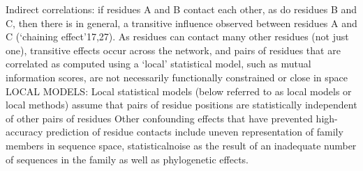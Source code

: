Indirect correlations: \cite{marks2012protein}
	if residues A and B contact each other, as do residues B and C, then there is in general, a transitive influence observed between residues A and C (`chaining effect'17,27). \cite{marks2012protein}
	As residues can contact many other residues (not just one), transitive effects occur across the network, and pairs of residues that are correlated as computed using a `local' statistical model, such as mutual information scores, are not necessarily functionally constrained or close in space \cite{marks2012protein}
LOCAL MODELS: \cite{marks2012protein}
	Local statistical models (below referred to as local models or local methods) assume that pairs of residue positions are statistically independent of other pairs of residues  \cite{marks2012protein}
	Other confounding effects that have prevented high-accuracy prediction of residue contacts include uneven representation of family members in sequence space, statisticalnoise as the result of an inadequate number of sequences in the family as well as phylogenetic effects. \cite{marks2012protein}


